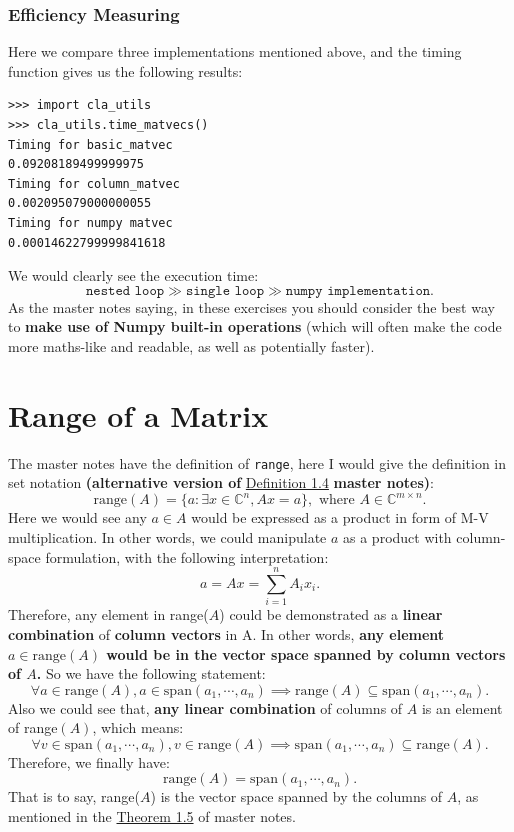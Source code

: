 \subsubsection*{Efficiency Measuring}
Here we compare three implementations mentioned above, and the timing function gives us the following results:
\begin{lstlisting}
>>> import cla_utils
>>> cla_utils.time_matvecs()
Timing for basic_matvec
0.09208189499999975
Timing for column_matvec
0.002095079000000055
Timing for numpy matvec
0.00014622799999841618
\end{lstlisting}
We would clearly see the execution time:
\[
\texttt{nested loop} \gg \texttt{single loop} \gg \texttt{numpy implementation}
.\]
As the master notes saying, in these exercises you should consider the best way to \textbf{make use of Numpy built-in operations} (which will often make the code more maths-like and readable, as well as potentially faster).
\section{Range of a Matrix}%
The master notes have the definition of \texttt{range}, here I would give the definition in set notation \textbf{(alternative version of} \href{https://comp-lin-alg.github.io/L1_preliminaries.html#range-nullspace-and-rank}{Definition 1.4}\textbf{ master notes)}:
\[
\text{range}(A) = \{a : \exists x \in \mathbb{C}^{n}, Ax = a \}, \text{ where } A \in \mathbb{C}^{m \times n}
.\]
Here we would see any $a \in A$ would be expressed as a product in form of M-V multiplication. In other words, we could manipulate $a$ as a product with column-space formulation, with the following interpretation:
\[
a = Ax = \sum_{i=1}^{n} A_i x_i
.\]
Therefore, any element in range($A$) could be demonstrated as a \textbf{linear combination} of \textbf{column vectors} in A. In other words, \textbf{any element $a \in \text{range}(A)$ would be in the vector space spanned by column vectors of $A$.} So we have the following statement:
\[
  \forall a \in \text{range}(A), a \in \text{span}(a_1, \cdots, a_n) \implies \text{range}(A) \subseteq \text{span}(a_1, \cdots, a_n)
.\] 
Also we could see that, \textbf{any linear combination} of columns of $A$ is an element of range$(A)$, which means:
\[
  \forall v \in \text{span}(a_1, \cdots, a_n), v \in \text{range}(A) \implies \text{span}(a_1, \cdots, a_n) \subseteq \text{range}(A)
.\] 
Therefore, we finally have:
\[
  \text{range}(A) = \text{span}(a_1, \cdots, a_n)
.\] 
That is to say, range($A$) is the vector space spanned by the columns of $A$, as mentioned in the  \href{https://comp-lin-alg.github.io/L1_preliminaries.html#range-nullspace-and-rank}{Theorem 1.5} of master notes. 

